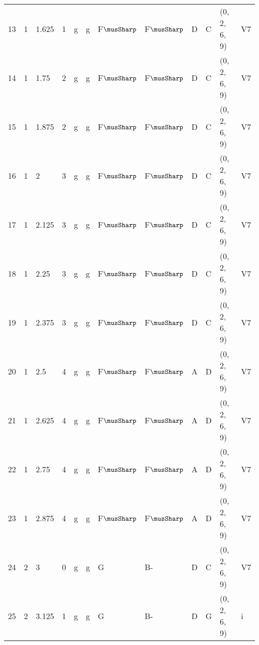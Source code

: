 \begin{tabular}{llllllllllll}
13  & 1       & 1.625  & 1               & g          & g              & F$\musSharp$     & F$\musSharp$      & D      & C         & (0, 2, 6, 9)     & V7             \\
14  & 1       & 1.75   & 2               & g          & g              & F$\musSharp$     & F$\musSharp$      & D      & C         & (0, 2, 6, 9)     & V7             \\
15  & 1       & 1.875  & 2               & g          & g              & F$\musSharp$     & F$\musSharp$      & D      & C         & (0, 2, 6, 9)     & V7             \\
16  & 1       & 2      & 3               & g          & g              & F$\musSharp$     & F$\musSharp$      & D      & C         & (0, 2, 6, 9)     & V7             \\
17  & 1       & 2.125  & 3               & g          & g              & F$\musSharp$     & F$\musSharp$      & D      & C         & (0, 2, 6, 9)     & V7             \\
18  & 1       & 2.25   & 3               & g          & g              & F$\musSharp$     & F$\musSharp$      & D      & C         & (0, 2, 6, 9)     & V7             \\
19  & 1       & 2.375  & 3               & g          & g              & F$\musSharp$     & F$\musSharp$      & D      & C         & (0, 2, 6, 9)     & V7             \\
20  & 1       & 2.5    & 4               & g          & g              & F$\musSharp$     & F$\musSharp$      & A      & D         & (0, 2, 6, 9)     & V7             \\
21  & 1       & 2.625  & 4               & g          & g              & F$\musSharp$     & F$\musSharp$      & A      & D         & (0, 2, 6, 9)     & V7             \\
22  & 1       & 2.75   & 4               & g          & g              & F$\musSharp$     & F$\musSharp$      & A      & D         & (0, 2, 6, 9)     & V7             \\
23  & 1       & 2.875  & 4               & g          & g              & F$\musSharp$     & F$\musSharp$      & A      & D         & (0, 2, 6, 9)     & V7             \\
24  & 2       & 3      & 0               & g          & g              & G      & B-      & D      & C         & (0, 2, 6, 9)     & V7             \\
25  & 2       & 3.125  & 1               & g          & g              & G      & B-      & D      & G         & (0, 2, 6, 9)     & i              \\

\end{tabular}
